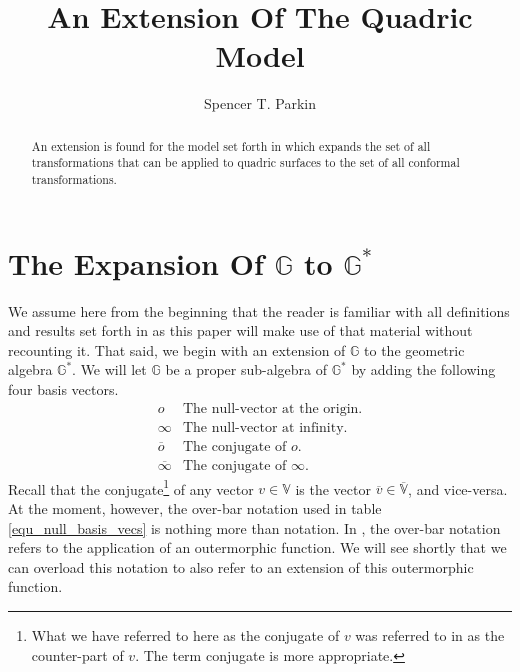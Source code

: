 \documentclass{birkjour}
\theoremstyle{definition}
\theoremstyle{remark}
\numberwithin{equation}{section}
\newcommand{\G}{\mathbb{G}}
\newcommand{\V}{\mathbb{V}}
\newcommand{\nvao}{o}
\newcommand{\nvai}{\infty}
\newcommand{\nvaob}{\overline{o}}
\newcommand{\nvaib}{\overline{\infty}}
\begin{document}
\title{An Extension Of The Quadric Model}

\author{Spencer T. Parkin}
\address{%
2113 S. Claremont Dr.\\
Bountiful, Utah  84010\\
USA}





\begin{abstract}
An extension is found for the model set forth in \cite{Parkin12}
which expands the set of all transformations that can be applied
to quadric surfaces to the set of all conformal transformations.
\end{abstract}

\maketitle

\section{The Expansion Of $\G$ to $\G^*$}

We assume here from the beginning that the reader is familiar with
all definitions and results set forth in \cite{Parkin12} as this paper
will make use of that material without recounting it.
That said, we begin with an extension of $\G$ to the geometric
algebra $\G^*$.  We will let $\G$ be a proper sub-algebra of $\G^*$
by adding the following four basis vectors.
\begin{equation}\label{equ_null_basis_vecs}
\begin{array}{ll}
\nvao & \mbox{The null-vector at the origin.} \\
\nvai & \mbox{The null-vector at infinity.} \\
\nvaob & \mbox{The conjugate of $\nvao$.} \\
\nvaib & \mbox{The conjugate of $\nvai$.}
\end{array}
\end{equation}
Recall that the conjugate\footnote{What we have referred to here
as the conjugate of $v$ was referred to in \cite{Parkin12} as the counter-part of $v$.
The term conjugate is more appropriate.}
of any vector $v\in\V$ is the vector $\overline{v}\in\overline{\V}$,
and vice-versa.  At the moment, however, the over-bar notation used in table \eqref{equ_null_basis_vecs}
is nothing more than notation.  In \cite{Parkin12}, the over-bar notation refers to the application
of an outermorphic function.  We will see shortly that we can overload this notation to
also refer to an extension of this outermorphic function.
\end{document}
